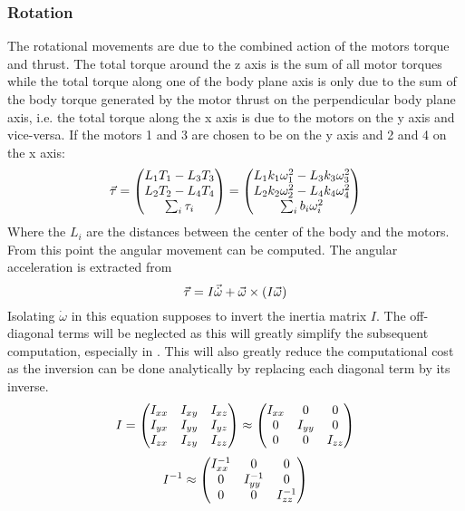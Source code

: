 \subsubsection{Rotation} 
The rotational movements are due to the combined action of the motors torque and thrust. The total torque around the z
axis is the sum of all motor torques while the total torque along one of the body plane axis is only due to
the sum of the body torque generated by the motor thrust on the perpendicular body plane axis, i.e. the
total torque along the x axis is due to the motors on the y axis and vice-versa. If the motors 1 and 3 are chosen to be
on the y axis and 2 and 4 on the x axis:
\begin{equation}\labeleq{bodyTau}
	\v{\tau} = \matrix{
	L_1T_1-L_3T_3\\
	L_2T_2-L_4T_4\\
	\sum_{i}{\tau_i}
	} = \matrix{
	L_1k_1\omega_1^2 - L_3k_3\omega_3^2\\
	L_2k_2\omega_2^2 - L_4k_4\omega_4^2\\
	\sum_{i}{b_i \omega_i^2}
	}
\end{equation}
Where the $L_i$ are the distances between the center of the body and the motors.
From this point the angular movement can be computed. The angular acceleration is extracted from
\begin{equation}
	\vec{\tau} = I\vec{\dot{\omega}} + \vec{\omega}\times(I\vec{\omega})
\end{equation}
Isolating $\dot{\omega}$ in this equation supposes to invert the inertia matrix $I$. The off-diagonal terms will be
neglected as this will greatly simplify the subsequent computation, especially in . This will also
greatly reduce the computational cost as the inversion can be done analytically by replacing each diagonal term by its
inverse.
\begin{equation}
	I = \begin{pmatrix}
	I_{xx} & I_{xy} & I_{xz}\\
	I_{yx} & I_{yy} & I_{yz}\\
	I_{zx} & I_{zy} & I_{zz}\\ 
	\end{pmatrix} \approx \begin{pmatrix}
	I_{xx} 	& 0 		& 0\\
	0 		& I_{yy} 	& 0\\
	0 		& 0 		& I_{zz}\\ 	
	\end{pmatrix}
\end{equation}
\begin{equation}
	I^{-1} \approx \begin{pmatrix}
	I_{xx}^{-1} & 0 			& 0\\
	0 			& I_{yy}^{-1} 	& 0\\
	0 			& 0 			& I_{zz}^{-1}\\ 		
	\end{pmatrix}
\end{equation}

